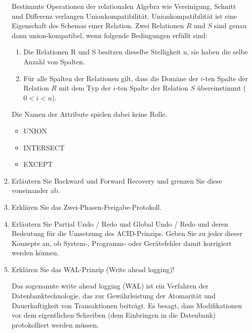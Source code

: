 \documentclass{bschlangaul-aufgabe}
\begin{document}
\begin{enumerate}
\begin{bAntwort}
Bestimmte Operationen der relationalen Algebra wie Vereinigung,
Schnitt und Differenz verlangen Unionkompatibilität.
Unionkompatibilität ist eine Eigenschaft des Schemas einer Relation.
Zwei Relationen $R$ und $S$ sind genau dann union-kompatibel, wenn
folgende Bedingungen erfüllt sind:

\begin{enumerate}
\item Die Relationen R und S besitzen dieselbe Stelligkeit n, \dh sie
haben die selbe Anzahl von Spalten.

\item Für alle Spalten der Relationen gilt, dass die Domäne der $i$-ten
Spalte der Relation $R$ mit dem Typ der $i$-ten Spalte der Relation $S$
übereinstimmt ($0 < i < n$).
\end{enumerate}

Die Namen der Attribute spielen dabei keine Rolle.


\begin{itemize}
\item UNION
\item INTERSECT
\item EXCEPT
\end{itemize}
\end{bAntwort}

%

\item Erläutern Sie Backward und Forward Recovery und grenzen Sie diese
voneinander ab.

%

\item Erklären Sie das Zwei-Phasen-Freigabe-Protokoll.

%

\item Erläutern Sie Partial Undo / Redo und Global Undo / Redo und deren
Bedeutung für die Umsetzung des ACID-Prinzips. Geben Sie zu jeder dieser
Konzepte an, ob System-, Programm- oder Gerätefehler damit korrigiert
werden können.

%

\item Erklären Sie das WAL-Prinzip (Write ahead logging)!

\begin{bAntwort}
Das sogenannte write ahead logging (WAL) ist ein Verfahren der
Datenbanktechnologie, das zur Gewährleistung der Atomarität und
Dauerhaftigkeit von Transaktionen beiträgt. Es besagt, dass
Modifikationen vor dem eigentlichen Schreiben (dem Einbringen in die
Datenbank) protokolliert werden müssen.


\end{bAntwort}
\end{enumerate}
\end{document}
